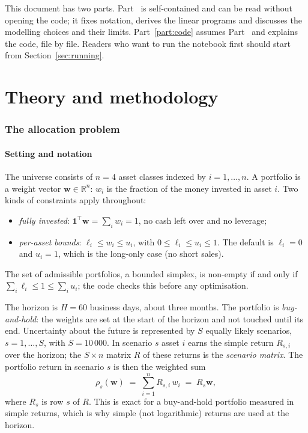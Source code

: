 \documentclass[11pt,a4paper]{article}
\newcommand{\R}{\mathbb{R}}
\newcommand{\w}{\mathbf{w}}
\newcommand{\ones}{\mathbf{1}}
\theoremstyle{plain}
\theoremstyle{remark}
\begin{document}
This document has two parts. Part~\ref{part:theory} is self-contained and
can be read without opening the code; it fixes notation, derives the linear
programs and discusses the modelling choices and their limits.
Part~\ref{part:code} assumes Part~\ref{part:theory} and explains the code,
file by file. Readers who want to run the notebook first should start from
Section~\ref{sec:running}.

\part{Theory and methodology}
\label{part:theory}

\section{The allocation problem}
\label{sec:problem}

\subsection{Setting and notation}

The universe consists of $n = 4$ asset classes indexed by $i = 1,\dots,n$.
A portfolio is a weight vector $\w \in \R^n$: $w_i$ is the fraction of the
money invested in asset $i$. Two kinds of constraints apply throughout:
\begin{itemize}[nosep]
  \item \emph{fully invested}: $\ones^\top \w = \sum_i w_i = 1$, no cash
        left over and no leverage;
  \item \emph{per-asset bounds}: $\ell_i \le w_i \le u_i$, with
        $0 \le \ell_i \le u_i \le 1$. The default is $\ell_i = 0$ and
        $u_i = 1$, which is the long-only case (no short sales).
\end{itemize}
The set of admissible portfolios, a bounded simplex, is non-empty if and
only if $\sum_i \ell_i \le 1 \le \sum_i u_i$; the code checks this before
any optimisation.

The horizon is $H = 60$ business days, about three months. The portfolio is
\emph{buy-and-hold}: the weights are set at the start of the horizon and not
touched until its end. Uncertainty about the future is represented by $S$
equally likely scenarios, $s = 1,\dots,S$, with $S = 10\,000$. In scenario
$s$ asset $i$ earns the simple return $R_{s,i}$ over the horizon; the
$S\times n$ matrix $R$ of these returns is the \emph{scenario matrix}. The
portfolio return in scenario $s$ is then the weighted sum
\begin{equation}
  \rho_s(\w) \;=\; \sum_{i=1}^n R_{s,i}\, w_i \;=\; R_s \w,
  \label{eq:portret}
\end{equation}
where $R_s$ is row $s$ of $R$. This is exact for a buy-and-hold portfolio
measured in simple returns, which is why simple (not logarithmic) returns
are used at the horizon.
\end{document}
